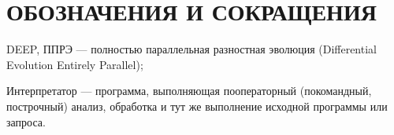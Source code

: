 \chapter*{ОБОЗНАЧЕНИЯ И СОКРАЩЕНИЯ}

\noindent DEEP, ППРЭ --- полностью параллельная разностная эволюция (Differential Evolution Entirely Parallel);

\noindent Интерпретатор --- программа, выполняющая пооператорный (покомандный, построчный) анализ, обработка и тут же выполнение исходной программы или запроса.

